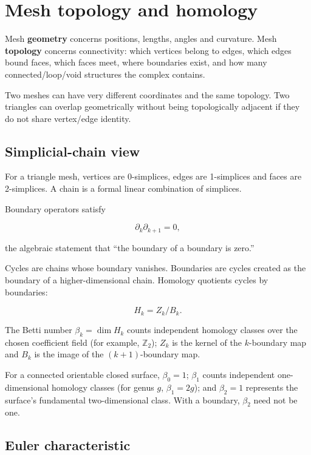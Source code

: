 \hypertarget{appendix-e38976cbbf86}{}
\section{Mesh topology and homology}\label{appendix-e38976cbbf86-mesh-topology-and-homology}

Mesh \textbf{geometry} concerns positions, lengths, angles and curvature. Mesh \textbf{topology} concerns connectivity: which vertices belong to edges, which edges bound faces, which faces meet, where boundaries exist, and how many connected/loop/void structures the complex contains.

Two meshes can have very different coordinates and the same topology. Two triangles can overlap geometrically without being topologically adjacent if they do not share vertex/edge identity.

\subsection{Simplicial-chain view}\label{appendix-e38976cbbf86-simplicial-chain-view}

For a triangle mesh, vertices are 0-simplices, edges are 1-simplices and faces are 2-simplices. A chain is a formal linear combination of simplices.

Boundary operators satisfy

\[
\partial_k\partial_{k+1}=0,
\]

the algebraic statement that ``the boundary of a boundary is zero.''

Cycles are chains whose boundary vanishes. Boundaries are cycles created as the boundary of a higher-dimensional chain. Homology quotients cycles by boundaries:

\[
H_k=Z_k/B_k.
\]

The Betti number \(\beta_k=\dim H_k\) counts independent homology classes over the chosen coefficient field (for example, \(\mathbb{Z}_2\)); \(Z_k\) is the kernel of the \(k\)-boundary map and \(B_k\) is the image of the \((k+1)\)-boundary map.

For a connected orientable closed surface, \(\beta_0=1\); \(\beta_1\) counts independent one-dimensional homology classes (for genus \(g\), \(\beta_1=2g\)); and \(\beta_2=1\) represents the surface's fundamental two-dimensional class. With a boundary, \(\beta_2\) need not be one.

\subsection{Euler characteristic}\label{appendix-e38976cbbf86-euler-characteristic}

